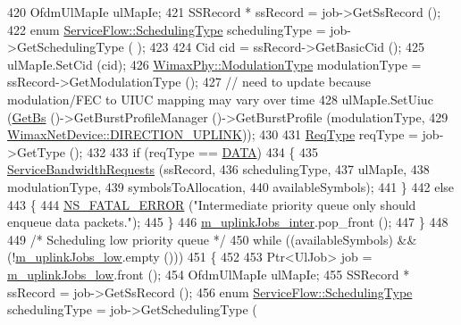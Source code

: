 \begin{DoxyCode}
420       OfdmUlMapIe ulMapIe;
421       SSRecord * ssRecord = job->GetSsRecord ();
422       \textcolor{keyword}{enum} \hyperlink{classns3_1_1ServiceFlow_a7990ba10be1e098328fd1e6382a26235}{ServiceFlow::SchedulingType} schedulingType = job->GetSchedulingType (
      );
423 
424       Cid cid = ssRecord->GetBasicCid ();
425       ulMapIe.SetCid (cid);
426       \hyperlink{classns3_1_1WimaxPhy_a044c5d8a48ca992c39c2a946f6e755fa}{WimaxPhy::ModulationType} modulationType = ssRecord->GetModulationType ();
427       \textcolor{comment}{// need to update because modulation/FEC to UIUC mapping may vary over time}
428       ulMapIe.SetUiuc (\hyperlink{classns3_1_1UplinkScheduler_afe61b7de71d92d2dff1b135744a6ff7e}{GetBs} ()->GetBurstProfileManager ()->GetBurstProfile (modulationType,
429                                                                              
      \hyperlink{classns3_1_1WimaxNetDevice_a194b6cf7eb59582328eb2531dc9ed884ad37a477621d1df190ff8d8fb933349cd}{WimaxNetDevice::DIRECTION\_UPLINK}));
430 
431       \hyperlink{namespacens3_a534f9a14e4d9aeb5b400e61f152a73a2}{ReqType} reqType = job->GetType ();
432 
433       \textcolor{keywordflow}{if} (reqType == \hyperlink{namespacens3_a534f9a14e4d9aeb5b400e61f152a73a2ae87e0f8f47d5619e16355b1f8caca558}{DATA})
434         \{
435           \hyperlink{classns3_1_1UplinkSchedulerMBQoS_a2405968bd60de182ce1e3d67ae416ba7}{ServiceBandwidthRequests} (ssRecord,
436                                     schedulingType,
437                                     ulMapIe,
438                                     modulationType,
439                                     symbolsToAllocation,
440                                     availableSymbols);
441         \}
442       \textcolor{keywordflow}{else}
443         \{
444           \hyperlink{group__fatal_ga5131d5e3f75d7d4cbfd706ac456fdc85}{NS\_FATAL\_ERROR} (\textcolor{stringliteral}{"Intermediate priority queue only should enqueue data packets."});
445         \}
446       \hyperlink{classns3_1_1UplinkSchedulerMBQoS_a70eef7c9cb6dad5e71a2105e07d1ec69}{m\_uplinkJobs\_inter}.pop\_front ();
447     \}
448 
449   \textcolor{comment}{/* Scheduling low priority queue */}
450   \textcolor{keywordflow}{while} ((availableSymbols) && (!\hyperlink{classns3_1_1UplinkSchedulerMBQoS_a73b59113ed20a512685dc76e93cf1faa}{m\_uplinkJobs\_low}.empty ()))
451     \{
452 
453       Ptr<UlJob> job = \hyperlink{classns3_1_1UplinkSchedulerMBQoS_a73b59113ed20a512685dc76e93cf1faa}{m\_uplinkJobs\_low}.front ();
454       OfdmUlMapIe ulMapIe;
455       SSRecord * ssRecord = job->GetSsRecord ();
456       \textcolor{keyword}{enum} \hyperlink{classns3_1_1ServiceFlow_a7990ba10be1e098328fd1e6382a26235}{ServiceFlow::SchedulingType} schedulingType = job->GetSchedulingType (

\end{DoxyCode}
